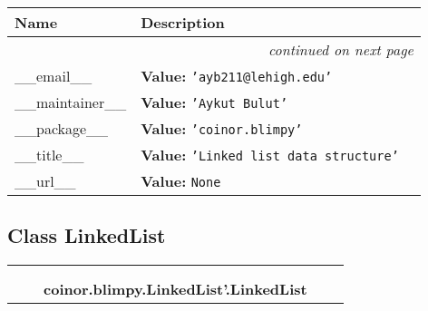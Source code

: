     \vspace{-1cm}
\hspace{\varindent}\begin{longtable}{|p{\varnamewidth}|p{\vardescrwidth}|l}
\cline{1-2}
\cline{1-2} \centering \textbf{Name} & \centering \textbf{Description}& \\
\cline{1-2}
\endhead\cline{1-2}\multicolumn{3}{r}{\small\textit{continued on next page}}\\\endfoot\cline{1-2}
\endlastfoot\raggedright \_\-\_\-e\-m\-a\-i\-l\-\_\-\_\- & \raggedright \textbf{Value:} 
{\tt \texttt{'}\texttt{ayb211@lehigh.edu}\texttt{'}}&\\
\cline{1-2}
\raggedright \_\-\_\-m\-a\-i\-n\-t\-a\-i\-n\-e\-r\-\_\-\_\- & \raggedright \textbf{Value:} 
{\tt \texttt{'}\texttt{Aykut Bulut}\texttt{'}}&\\
\cline{1-2}
\raggedright \_\-\_\-p\-a\-c\-k\-a\-g\-e\-\_\-\_\- & \raggedright \textbf{Value:} 
{\tt \texttt{'}\texttt{coinor.blimpy}\texttt{'}}&\\
\cline{1-2}
\raggedright \_\-\_\-t\-i\-t\-l\-e\-\_\-\_\- & \raggedright \textbf{Value:} 
{\tt \texttt{'}\texttt{Linked list data structure}\texttt{'}}&\\
\cline{1-2}
\raggedright \_\-\_\-u\-r\-l\-\_\-\_\- & \raggedright \textbf{Value:} 
{\tt None}&\\
\cline{1-2}
\end{longtable}



\subsection{Class LinkedList}

    \label{coinor:blimpy:LinkedList':LinkedList}
\begin{tabular}{cccccc}
\multicolumn{2}{r}{\settowidth{\BCL}{object}\multirow{2}{\BCL}{object}}
&&
  \\\cline{3-3}
  &&\multicolumn{1}{c|}{}
&&
  \\
&&\multicolumn{2}{l}{\textbf{coinor.blimpy.LinkedList'.LinkedList}}
\end{tabular}

